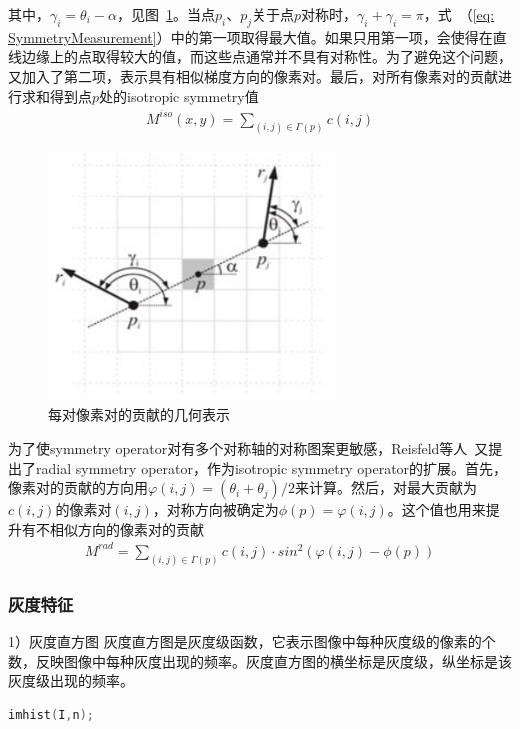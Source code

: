 \documentclass[12pt]{article}
\begin{document}
其中，$\gamma_i = \theta_i-\alpha$，见图~\ref{fig: PixelpairContribution}。当点$p_i$、$p_j$关于点$p$对称时，$\gamma_i+\gamma_i=\pi$，式~（\ref{eq: SymmetryMeasurement}）中的第一项取得最大值。如果只用第一项，会使得在直线边缘上的点取得较大的值，而这些点通常并不具有对称性。为了避免这个问题，又加入了第二项，表示具有相似梯度方向的像素对。最后，对所有像素对的贡献进行求和得到点$p$处的isotropic symmetry值
\begin{align}
M^{iso}(x, y) = \sum_{(i, j)\in \Gamma(p)} c(i, j)
\label{eq: IsotropicSymmetry}
\end{align}

\begin{figure}[!ht]
 \centering
 \includegraphics[width=3in]{PixelpairContribution}
\caption{每对像素对的贡献的几何表示}
\label{fig: PixelpairContribution}
\end{figure}

为了使symmetry operator对有多个对称轴的对称图案更敏感，Reisfeld等人~\cite{reisfeld1995context}又提出了radial symmetry operator，作为isotropic symmetry operator的扩展。首先，像素对的贡献的方向用$\varphi(i, j) = (\theta_i+\theta_j)/2$来计算。然后，对最大贡献为$c(i, j)$的像素对$(i, j)$，对称方向被确定为$\phi(p) = \varphi(i, j)$。这个值也用来提升有不相似方向的像素对的贡献
\begin{align}
M^{rad}= \sum_{(i, j)\in \Gamma(p)} c(i, j) \cdot sin^2(\varphi(i, j) - \phi(p))
\end{align}

\subsubsection{灰度特征}

1）灰度直方图
灰度直方图是灰度级函数，它表示图像中每种灰度级的像素的个数，反映图像中每种灰度出现的频率。灰度直方图的横坐标是灰度级，纵坐标是该灰度级出现的频率。

    \begin{lstlisting}[language=C++]
    imhist(I,n);
    \end{lstlisting}
    
\end{document}
